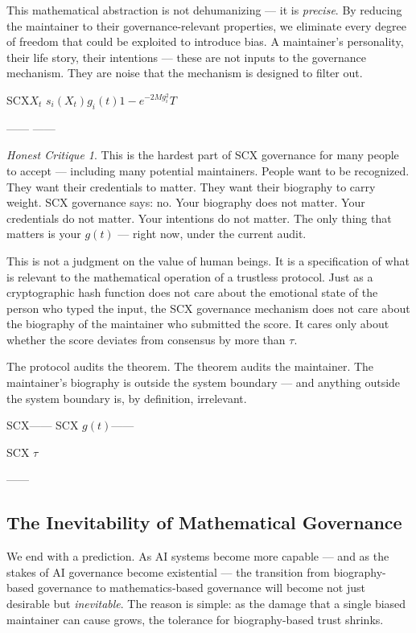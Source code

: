 \documentclass[12pt,a4paper]{article}
\theoremstyle{remark}
\newtheorem{honesthit}{Honest Critique}[section]
\newenvironment{hitbox}{%
  \begin{center}
  \color{red}
  \begin{minipage}{0.92\textwidth}
  \begin{honesthit}
}{%
  \end{honesthit}
  \end{minipage}
  \end{center}
}
\begin{document}
This mathematical abstraction is not dehumanizing — it is \textit{precise}.
By reducing the maintainer to their governance-relevant properties, we eliminate
every degree of freedom that could be exploited to introduce bias. A maintainer's
personality, their life story, their intentions — these are not inputs to the
governance mechanism. They are noise that the mechanism is designed to filter out.

\noindent\textbf{}
SCX$X_t$
$s_i(X_t)$$g_i(t)$$1 - e^{-2M g_i^2}$$T$


——
——


\begin{hitbox}
This is the hardest part of SCX governance for many people to accept — including
many potential maintainers. People want to be recognized. They want their
credentials to matter. They want their biography to carry weight. SCX governance
says: no. Your biography does not matter. Your credentials do not matter. Your
intentions do not matter. The only thing that matters is your $g(t)$ — right now,
under the current audit.

This is not a judgment on the value of human beings. It is a specification of
what is relevant to the mathematical operation of a trustless protocol. Just as
a cryptographic hash function does not care about the emotional state of the
person who typed the input, the SCX governance mechanism does not care about
the biography of the maintainer who submitted the score. It cares only about
whether the score deviates from consensus by more than $\tau$.

The protocol audits the theorem. The theorem audits the maintainer. The
maintainer's biography is outside the system boundary — and anything outside
the system boundary is, by definition, irrelevant.

\begin{center}
\small\textbf{}
SCX——
SCX
$g(t)$——


SCX
$\tau$

——

\end{center}
\end{hitbox}

\subsection{The Inevitability of Mathematical Governance}

We end with a prediction. As AI systems become more capable — and as the stakes
of AI governance become existential — the transition from biography-based
governance to mathematics-based governance will become not just desirable but
\textit{inevitable}. The reason is simple: as the damage that a single biased
maintainer can cause grows, the tolerance for biography-based trust shrinks.
\end{document}
